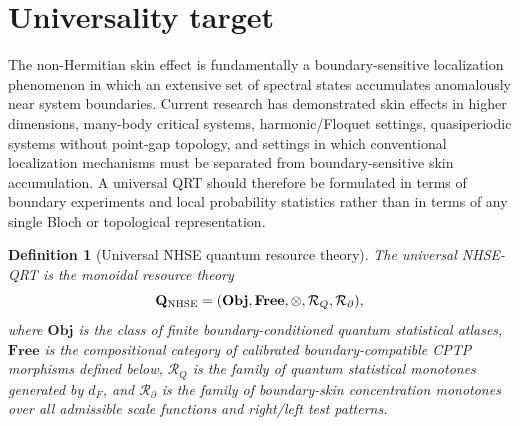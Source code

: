 \documentclass[11pt]{article}
\newtheorem{definition}{Definition}
\newcommand{\rskin}{r_{\rm skin}}
\newcommand{\Obj}{\mathbf{Obj}}
\newcommand{\Free}{\mathbf{Free}}
\begin{document}
\begin{abstract}
The formalism covers ordinary and multiband lattice NHSE, higher-dimensional and corner/higher-order skin effects, quasiperiodic and disordered systems without Bloch theory, many-body/Fock-space realizations after choosing a finite configuration-space cell metric, and Floquet/harmonic realizations after the standard finite Sambe enlargement. Boundary-insensitive non-Hermitian localization is explicitly separated from NHSE: it has zero calibrated skin resource when the same boundary concentration appears in the reference experiment. The Hatano--Nelson chain is an exact calibration battery with $\rskin=|g|$ for the fidelity resource and with the new boundary-tail profile having exact inverse-localization-length coefficient $|g|$.

The resulting theory is universal at the operational QRT level: it is a closed object theory with compositional free operations, exact conversion, complete families of separating witnesses, and a non-circular physical faithfulness theorem for boundary-sensitive NHSE. The construction deliberately does not identify unrelated non-Hermitian localization phenomena with NHSE merely because they are localized.
\end{abstract}

\section{Universality target}

The non-Hermitian skin effect is fundamentally a boundary-sensitive localization phenomenon in which an extensive set of spectral states accumulates anomalously near system boundaries. Current research has demonstrated skin effects in higher dimensions, many-body critical systems, harmonic/Floquet settings, quasiperiodic systems without point-gap topology, and settings in which conventional localization mechanisms must be separated from boundary-sensitive skin accumulation. \cite{Universal2D,ManyBodyCritical,HarmonicNHSE,QuasicrystalNHSE,UnifiedLocalization} A universal QRT should therefore be formulated in terms of boundary experiments and local probability statistics rather than in terms of any single Bloch or topological representation.

\begin{definition}[Universal NHSE quantum resource theory]
The universal NHSE-QRT is the monoidal resource theory
\[
\mathbf Q_{\rm NHSE}
=
(\Obj,\Free,\otimes,\mathcal R_Q,\mathcal R_{\partial}),
\]
where $\Obj$ is the class of finite boundary-conditioned quantum statistical atlases, $\Free$ is the compositional category of calibrated boundary-compatible CPTP morphisms defined below, $\mathcal R_Q$ is the family of quantum statistical monotones generated by $d_F$, and $\mathcal R_{\partial}$ is the family of boundary-skin concentration monotones over all admissible scale functions and right/left test patterns.
\end{definition}
\end{document}
